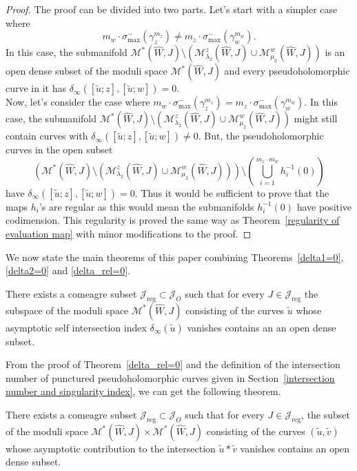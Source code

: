 \documentclass[11pt, a4paper]{amsart}
\newcommand{\cJ}{\mathcal{J}}
\newcommand{\cM}{\mathcal{M}}
\begin{document}
\begin{proof}
The proof can be divided into two parts. Let's start with a simpler case where 
$$m_w\cdot \sigma^-_{\max}(\gamma_z^{m_z}) \neq m_z \cdot \sigma^-_{\max}(\gamma_w^{m_w}).$$
In this case, the submanifold $\cM^*(\widehat{W},J)\setminus \left(\cM^z_{\lambda_2}(\widehat{W},J) \cup \cM^w_{\mu_2}(\widehat{W},J)\right)$ is an open dense subset of the moduli space $\cM^*(\widehat{W},J)$ and every pseudoholomorphic curve in it has $\delta_{\infty}([\tilde{u}; z], [\tilde{u};w])=0$.\\

Now, let's consider the case where $m_w\cdot \sigma^-_{\max}(\gamma_z^{m_z}) = m_z \cdot \sigma^-_{\max}(\gamma_w^{m_w})$. In this case, the submanifold $\cM^*(\widehat{W},J)\setminus \left(\cM^z_{\lambda_2}(\widehat{W},J) \cup \cM^w_{\mu_2}(\widehat{W},J)\right)$ might still contain curves with $\delta_{\infty}([\tilde{u}; z], [\tilde{u};w])\neq0$. But, the pseudoholomorphic curves in the open subset 
$$\left( \cM^*(\widehat{W},J)\setminus \left(\cM^z_{\lambda_2}(\widehat{W},J) \cup \cM^w_{\mu_2}(\widehat{W},J)\right) \right) \setminus (\bigcup\limits_{i=1}^{m_z\cdot m_w}h_i^{-1}(0))$$
have $\delta_{\infty}([\tilde{u}; z], [\tilde{u};w])=0$. Thus it would be sufficient to prove that the maps $h_{i}$'s are regular as this would mean the submanifolds $h_{i}^{-1}(0)$ have positive codimension. This regularity is proved the same way as Theorem~\ref{regularity of evaluation map} with minor modifications to the proof.
\end{proof}


We now state the main theorems of this paper combining Theorems~\ref{delta1=0}, \ref{delta2=0} and \ref{delta_rel=0}. 

\begin{theorem}\label{maintheorem1}
There exists a comeagre subset $\cJ_{\mathrm{reg}} \subset \cJ_O$ such that for every $J \in \cJ_{\mathrm{reg}}$ the subspace of the moduli space $\cM^*(\widehat{W},J)$ consisting of the curves $\tilde{u}$ whose asymptotic self intersection index $\delta_{\infty}(\tilde{u})$ vanishes contains an an open dense subset.
\end{theorem}

From the proof of Theorem~\ref{delta_rel=0} and the definition of the intersection number of punctured pseudoholomorphic curves given in Section~\ref{intersection number and singularity index}, we can get the following theorem.

\begin{theorem}\label{maintheorem2}
There exists a comeagre subset $\cJ_{\mathrm{reg}} \subset \cJ_O$ such that for every $J\in \cJ_{\mathrm{reg}}$, the subset of the moduli space $\cM^*(\widehat{W},J) \times \cM^*(\widehat{W},J) $ consisting of the curves $(\tilde{u},\tilde{v})$ whose asymptotic contribution to the intersection $\tilde{u}*\tilde{v}$ vanishes contains an open dense subset.
\end{theorem}
\end{document}
